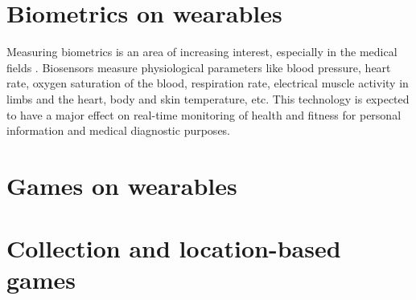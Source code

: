 \documentclass{SIGCHI2015LaTex/sigchi}
\begin{document}
\section{Biometrics on wearables}
Measuring biometrics is an area of increasing interest, especially in the medical fields \cite{pantelopoulos2010survey}. Biosensors measure physiological parameters like blood pressure, heart rate, oxygen saturation of the blood, respiration rate, electrical muscle activity in limbs and the heart, body and skin temperature, etc. This technology is expected to have a major effect on real-time monitoring of health and fitness for personal information and medical diagnostic purposes. 

\section{Games on wearables}


\section{Collection and location-based games}
\end{document}
